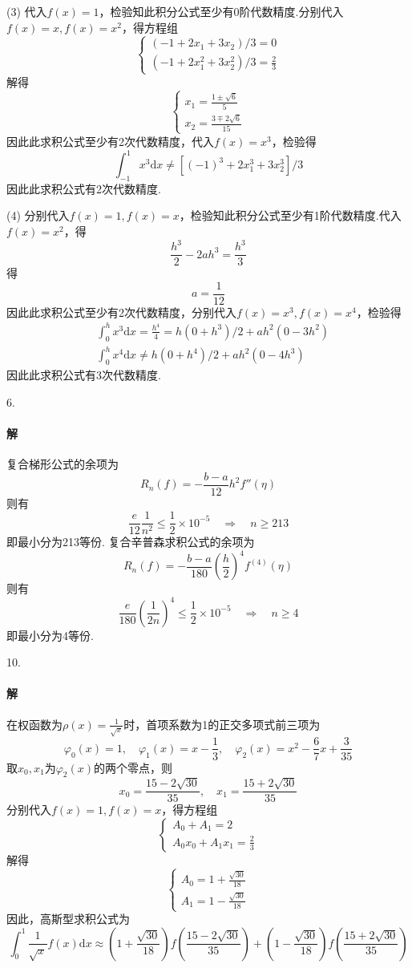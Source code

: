 \documentclass[12pt, a4paper]{article}
\theoremstyle{margin}
\newcommand{\rd}{\mathrm{d}}
\begin{document}
(3) 代入$f(x) = 1$，检验知此积分公式至少有0阶代数精度.分别代入$f(x) = x, f(x) = x^2$，得方程组
\[\begin{cases}
(-1 + 2x_1 + 3x_2) / 3 = 0 \\
(-1 + 2x_1^2 + 3x_2^2) / 3 = \frac{2}{3}
\end{cases}\]
解得
\[\begin{cases}
x_1 = \frac{1 \pm \sqrt{6}}{5} \\
x_2 = \frac{3 \mp 2\sqrt{6}}{15}
\end{cases}\]
因此此求积公式至少有2次代数精度，代入$f(x) = x^3$，检验得
\[\int_{-1}^{1} x^3 \rd x \ne [(-1)^3 + 2x_1^3 + 3x_2^3] / 3\]
因此此求积公式有2次代数精度. 

(4) 分别代入$f(x) = 1, f(x) = x$，检验知此积分公式至少有1阶代数精度.代入$f(x) = x^2$，得
\[\frac{h^3}{2} - 2ah^3 = \frac{h^3}{3}\]
得
\[a = \frac{1}{12}\]
因此此求积公式至少有2次代数精度，分别代入$f(x) = x^3, f(x) = x^4$，检验得
\[\begin{split}
& \int_{0}^{h} x^3 \rd x = \frac{h^4}{4} = h(0 + h^3) / 2 + ah^2(0 - 3h^2)\\
& \int_{0}^{h} x^4 \rd x \ne h(0 + h^4) / 2 + ah^2(0 - 4h^3)
\end{split}\]
因此此求积公式有3次代数精度. 
\newline

6. \paragraph{解} 复合梯形公式的余项为
\[R_n(f) = -\frac{b - a}{12}h^2f''(\eta)\]
则有
\[\frac{e}{12}\frac{1}{n^2} \le \frac{1}{2} \times 10^{-5} \quad \Rightarrow \quad n \ge 213\]
即最小分为213等份.
复合辛普森求积公式的余项为
\[R_n(f) = -\frac{b - a}{180}(\frac{h}{2})^4f^{(4)}(\eta)\]
则有
\[\frac{e}{180}(\frac{1}{2n})^4 \le \frac{1}{2} \times 10^{-5} \quad \Rightarrow \quad n \ge 4\]
即最小分为4等份.
\newline

10. \paragraph{解} 在权函数为$\rho(x) = \frac{1}{\sqrt{x}}$时，首项系数为1的正交多项式前三项为
\[\varphi_0(x) = 1, \quad \varphi_1(x) = x - \frac{1}{3}, \quad \varphi_2(x) = x^2 - \frac{6}{7}x + \frac{3}{35}\]
取$x_0, x_1$为$\varphi_2(x)$的两个零点，则
\[x_0 = \frac{15 - 2\sqrt{30}}{35}, \quad x_1 = \frac{15 + 2\sqrt{30}}{35}\]
分别代入$f(x) = 1, f(x) = x$，得方程组
\[\begin{cases}
A_0 + A_1 = 2 \\
A_0 x_0 + A_1 x_1 = \frac{2}{3}
\end{cases}\]
解得
\[\begin{cases}
A_0 = 1 + \frac{\sqrt{30}}{18} \\
A_1 = 1 - \frac{\sqrt{30}}{18}
\end{cases}\]
因此，高斯型求积公式为
\[\int_{0}^{1}\frac{1}{\sqrt{x}}f(x) \rd x \approx (1 + \frac{\sqrt{30}}{18})f(\frac{15 - 2\sqrt{30}}{35}) + (1 - \frac{\sqrt{30}}{18})f(\frac{15 + 2\sqrt{30}}{35})\]
\end{document}
